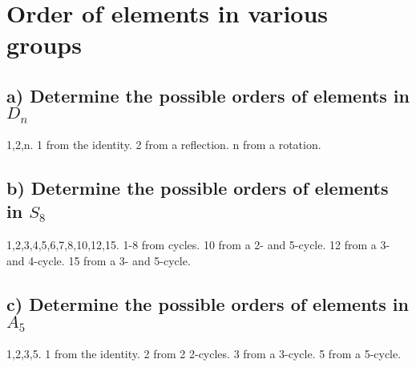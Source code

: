 \section{Order of elements in various groups}

\subsection*{a) Determine the possible orders of elements in $D_n$}
	1,2,n. 1 from the identity. 2 from a reflection. n from a rotation.

\subsection*{b) Determine the possible orders of elements in $S_8$}
	1,2,3,4,5,6,7,8,10,12,15. 1-8 from cycles. 10 from a 2- and 5-cycle. 12 from a 3- and 4-cycle. 15 from a 3- and 5-cycle.

\subsection*{c) Determine the possible orders of elements in $A_5$}
	1,2,3,5. 1 from the identity. 2 from 2 2-cycles. 3 from a 3-cycle. 5 from a 5-cycle.
